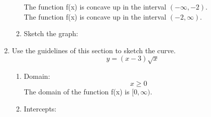 \documentclass[12pt]{article}
\begin{document}
\begin{enumerate}
\begin{enumerate}
\begin{center}
\begin{tabular}{c c c c c c c c}
                \end{tabular}    
            \end{center}
            The function f(x) is concave up in the interval $(-\infty, -2)$.\\
            The function f(x) is concave up in the interval $(-2, \infty)$.
        \item Sketch the graph:
            \begin{figure}[!h]
                \centering
                \begin{framed}
                \end{framed}
            \end{figure}
    \end{enumerate}
    \setcounter{enumi}{20}
    \item Use the guidelines of this section to sketch the curve.
    \[y = (x-3)\sqrt{x}\]
    \begin{enumerate}
        \item Domain:
            \[x \geq 0\]
        The domain of the function f(x) is $[0,\infty)$.
        \item Intercepts:

\end{enumerate}
\end{enumerate}
\end{document}
